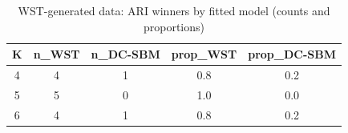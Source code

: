 \begin{table}[!h]
\centering
\caption{WST-generated data: ARI winners by fitted model (counts and proportions)\\\label{tab:wst-ari-winners}}
\centering
\begin{tabular}[t]{ccccc}
\toprule
K & n_WST & n_DC-SBM & prop_WST & prop_DC-SBM\\
\midrule
4 & 4 & 1 & 0.8 & 0.2\\
5 & 5 & 0 & 1.0 & 0.0\\
6 & 4 & 1 & 0.8 & 0.2\\
\bottomrule
\end{tabular}
\end{table}
